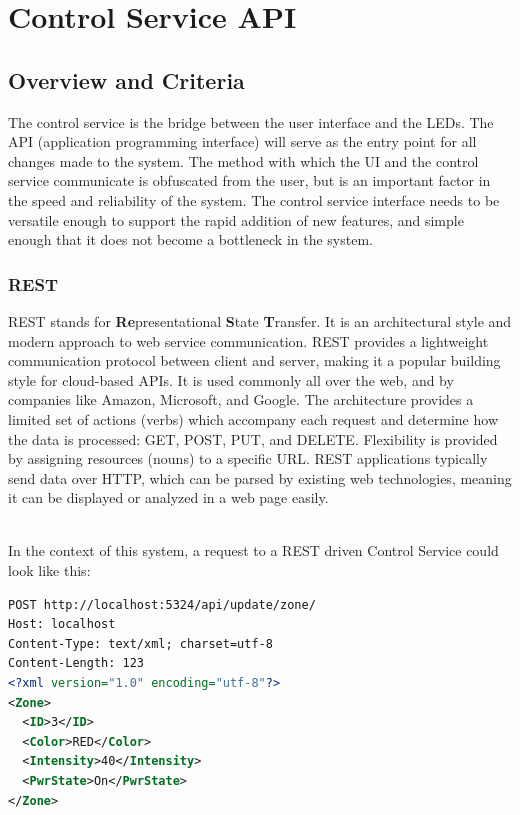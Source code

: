 	\section{Control Service API}
		\subsection{Overview and Criteria}
		The control service is the bridge between the user interface and the LEDs.
		The API (application programming interface) will serve as the entry point for all changes made to the system.
		The method with which the UI and the control service communicate is obfuscated from the user, but is an important factor in the speed and reliability of the system.
		The control service interface needs to be versatile enough to support the rapid addition of new features, and simple enough that it does not become a bottleneck in the system.

		\subsubsection{REST}
		REST stands for \textbf{Re}presentational \textbf{S}tate \textbf{T}ransfer.
		It is an architectural style and modern approach to web service communication. \cite[ch.5]{rest1}
		REST provides a lightweight communication protocol between client and server,
		making it a popular building style for cloud-based APIs.
		It is used commonly all over the web, and by companies like Amazon, Microsoft, and Google. \cite{rest2}
		The architecture provides a limited set of actions (verbs) which accompany each request and determine how the data is processed: GET, POST, PUT, and DELETE.
		Flexibility is provided by assigning resources (nouns) to a specific URL.
		REST applications typically send data over HTTP, which can be parsed by existing web technologies, meaning it can be displayed or analyzed in a web page easily.

		\noindent \\In the context of this system, a request to a REST driven Control Service could look like this:
		\begin{lstlisting}[language=XML]
POST http://localhost:5324/api/update/zone/
Host: localhost
Content-Type: text/xml; charset=utf-8
Content-Length: 123
<?xml version="1.0" encoding="utf-8"?>
<Zone>
  <ID>3</ID>
  <Color>RED</Color>
  <Intensity>40</Intensity>
  <PwrState>On</PwrState>
</Zone>
		\end{lstlisting}


